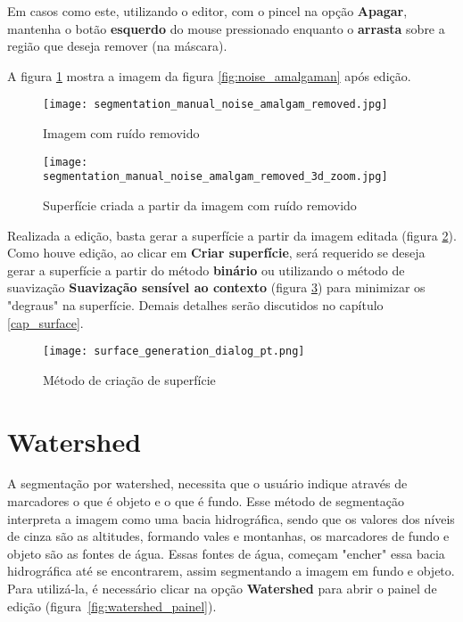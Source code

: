 Em casos como este, utilizando o editor, com o pincel na opção \textbf{Apagar}, mantenha o
botão \textbf{esquerdo} do mouse pressionado enquanto o \textbf{arrasta} sobre a região que
deseja remover (na máscara).

A figura \ref{fig:editor_amalgaman} mostra a imagem da figura \ref{fig:noise_amalgaman} após
edição.

\begin{figure}[!htb]
\centering
\texttt{[image: segmentation\_manual\_noise\_amalgam\_removed.jpg]}
\caption{Imagem com ruído removido}
\label{fig:editor_amalgaman}
\end{figure}

\begin{figure}[!htb]
\centering
\texttt{[image: segmentation\_manual\_noise\_amalgam\_removed\_3d\_zoom.jpg]}
\caption{Superfície criada a partir da imagem com ruído removido}
\label{fig:surface_edited_amalgaman}
\end{figure}

\newpage
Realizada a edição, basta gerar a superfície a partir da imagem editada (figura
\ref{fig:surface_edited_amalgaman}). Como houve edição, ao clicar em \textbf{Criar superfície}, será
requerido se deseja gerar a superfície a partir do método \textbf{binário} ou utilizando o método de suavização
\textbf{Suavização sensível ao contexto} (figura \ref{fig:new_surface_edited}) para minimizar os "degraus" na superfície.
Demais detalhes serão discutidos no capítulo \ref{cap_surface}.

\begin{figure}[!htb]
\centering
\texttt{[image: surface\_generation\_dialog\_pt.png]}
\caption{Método de criação de superfície}
\label{fig:new_surface_edited}
\end{figure}


\section{Watershed}

A segmentação por watershed, necessita que o usuário indique através de marcadores o que é objeto e o que é fundo. Esse método de segmentação interpreta a imagem como uma bacia hidrográfica, sendo que os valores dos níveis de cinza são as altitudes, formando vales e montanhas, os marcadores de fundo e objeto são as fontes de água. Essas fontes de água, começam "encher" essa bacia hidrográfica até se encontrarem, assim segmentando a imagem em fundo e objeto. Para utilizá-la, é necessário clicar na opção \textbf{Watershed} para abrir o painel de edição (figura~\ref{fig:watershed_painel}).

